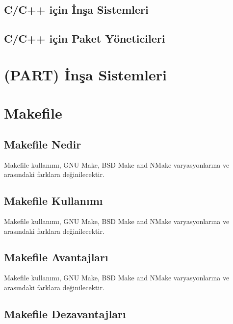 \documentclass[
]{book}
\begin{document}
\hypertarget{cc-iuxe7in-inux15fa-sistemleri}{%
\section{C/C++ için İnşa Sistemleri}\label{cc-iuxe7in-inux15fa-sistemleri}}

\hypertarget{cc-iuxe7in-paket-yuxf6neticileri}{%
\section{C/C++ için Paket Yöneticileri}\label{cc-iuxe7in-paket-yuxf6neticileri}}

\hypertarget{part-inux15fa-sistemleri}{%
\chapter{(PART) İnşa Sistemleri}\label{part-inux15fa-sistemleri}}

\hypertarget{makefile}{%
\chapter{Makefile}\label{makefile}}

\hypertarget{makefile-nedir}{%
\section{Makefile Nedir}\label{makefile-nedir}}

Makefile kullanımı, GNU Make, BSD Make and NMake varyasyonlarına ve arasındaki farklara değinilecektir.

\hypertarget{makefile-kullanux131mux131}{%
\section{Makefile Kullanımı}\label{makefile-kullanux131mux131}}

Makefile kullanımı, GNU Make, BSD Make and NMake varyasyonlarına ve arasındaki farklara değinilecektir.

\hypertarget{makefile-avantajlarux131}{%
\section{Makefile Avantajları}\label{makefile-avantajlarux131}}

Makefile kullanımı, GNU Make, BSD Make and NMake varyasyonlarına ve arasındaki farklara değinilecektir.

\hypertarget{makefile-dezavantajlarux131}{%
\section{Makefile Dezavantajları}\label{makefile-dezavantajlarux131}}
\end{document}

